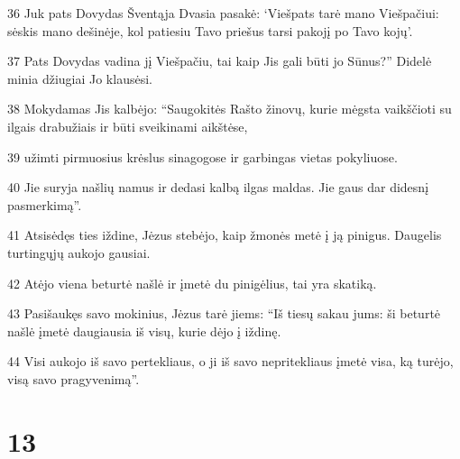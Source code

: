 \par 36 Juk pats Dovydas Šventąja Dvasia pasakė: ‘Viešpats tarė mano Viešpačiui: sėskis mano dešinėje, kol patiesiu Tavo priešus tarsi pakojį po Tavo kojų’. 
\par 37 Pats Dovydas vadina jį Viešpačiu, tai kaip Jis gali būti jo Sūnus?” Didelė minia džiugiai Jo klausėsi. 
\par 38 Mokydamas Jis kalbėjo: “Saugokitės Rašto žinovų, kurie mėgsta vaikščioti su ilgais drabužiais ir būti sveikinami aikštėse, 
\par 39 užimti pirmuosius krėslus sinagogose ir garbingas vietas pokyliuose. 
\par 40 Jie suryja našlių namus ir dedasi kalbą ilgas maldas. Jie gaus dar didesnį pasmerkimą”. 
\par 41 Atsisėdęs ties iždine, Jėzus stebėjo, kaip žmonės metė į ją pinigus. Daugelis turtingųjų aukojo gausiai. 
\par 42 Atėjo viena beturtė našlė ir įmetė du pinigėlius, tai yra skatiką. 
\par 43 Pasišaukęs savo mokinius, Jėzus tarė jiems: “Iš tiesų sakau jums: ši beturtė našlė įmetė daugiausia iš visų, kurie dėjo į iždinę. 
\par 44 Visi aukojo iš savo pertekliaus, o ji iš savo nepritekliaus įmetė visa, ką turėjo, visą savo pragyvenimą”.



\chapter{13}



